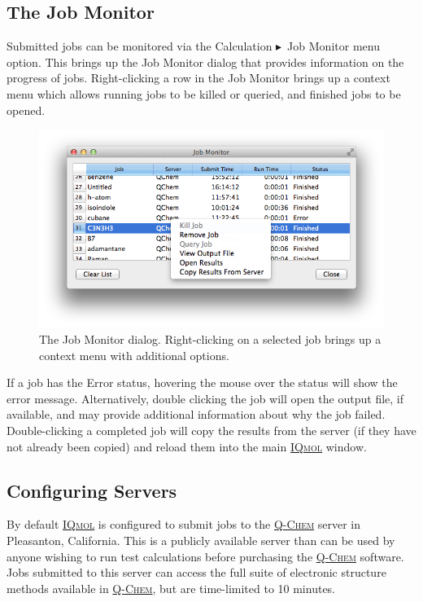\documentclass[a4paper,12pt]{article}
\newcommand{\qchem}{\href{http://q-chem.com}{{\scshape Q-Chem}}}
\newcommand{\iqmol}{\href{http://iqmol.org}{{\scshape IQmol}}}
\newcommand{\bt}{\ensuremath{\blacktriangleright}}
\begin{document}
\subsection{The Job Monitor}

Submitted jobs can be monitored via the Calculation \bt\ Job Monitor menu
option.  This brings up the Job Monitor dialog that provides information on the
progress of jobs.  Right-clicking a row in the Job Monitor brings up a context
menu which allows running jobs to be killed or queried, and finished jobs to be
opened.
\begin{figure}
\begin{center}
\includegraphics[scale=0.5]{figures/JobMonitor.png} 
\caption{The Job Monitor dialog.  Right-clicking on a selected job brings up
a context menu with additional options.}
\end{center}
\end{figure}

If a job has the Error status, hovering the mouse over the status will show the
error message.  Alternatively, double clicking the job will open the output
file, if available, and may provide additional information about why the job
failed.  Double-clicking a completed job will copy the results from the
server (if they have not already been copied) and reload them into the main
\iqmol{} window.


\subsection{Configuring Servers}

By default \iqmol{} is configured to submit jobs to the \qchem{} server in
Pleasanton, California.  This is a publicly available server than can be used
by anyone wishing to run test calculations before purchasing the \qchem{}
software.  Jobs submitted to this server can access the full suite of
electronic structure methods available in \qchem{}, but are time-limited to 10
minutes. 
\end{document}
